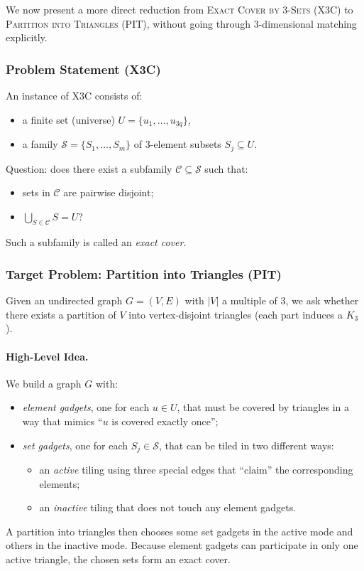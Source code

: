 \documentclass[9pt]{extarticle}
\begin{document}
We now present a more direct reduction from \textsc{Exact Cover by 3-Sets}
(X3C) to \textsc{Partition into Triangles} (PIT), without going through
3-dimensional matching explicitly.

\subsubsection*{Problem Statement (X3C)}

An instance of X3C consists of:
\begin{itemize}
    \item a finite set (universe) $U = \{u_1,\dots,u_{3q}\}$,
    \item a family $\mathcal{S} = \{S_1,\dots,S_m\}$ of 3-element subsets
          $S_j \subseteq U$.
\end{itemize}
Question: does there exist a subfamily $\mathcal{C} \subseteq \mathcal{S}$ such
that:
\begin{itemize}
    \item sets in $\mathcal{C}$ are pairwise disjoint;
    \item $\bigcup_{S \in \mathcal{C}} S = U$?
\end{itemize}
Such a subfamily is called an \emph{exact cover}.

\subsubsection*{Target Problem: Partition into Triangles (PIT)}

Given an undirected graph $G = (V,E)$ with $|V|$ a multiple of 3, we ask whether
there exists a partition of $V$ into vertex-disjoint triangles (each part
induces a $K_3$).

\paragraph{High-Level Idea.}
We build a graph $G$ with:
\begin{itemize}
    \item \emph{element gadgets}, one for each $u \in U$, that must be covered
          by triangles in a way that mimics ``$u$ is covered exactly once'';
    \item \emph{set gadgets}, one for each $S_j \in \mathcal{S}$, that can be
          tiled in two different ways:
          \begin{itemize}
              \item an \emph{active} tiling using three special edges that “claim”
                    the corresponding elements;
              \item an \emph{inactive} tiling that does not touch any element
                    gadgets.
          \end{itemize}
\end{itemize}
A partition into triangles then chooses some set gadgets in the active mode and
others in the inactive mode.  Because element gadgets can participate in only
one active triangle, the chosen sets form an exact cover.
\end{document}
